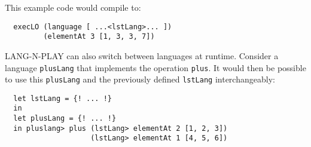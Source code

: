 This example code would compile to:

\begin{verbatim}
  execLO (language [ ...<lstLang>... ]) 
         (elementAt 3 [1, 3, 3, 7])
\end{verbatim}

LANG-N-PLAY can also switch between languages at runtime. Consider a language \lstinline|plusLang| that implements the operation \lstinline|plus|. It would then be possible to use this \lstinline|plusLang| and the previously defined \lstinline|lstLang| interchangeably:

\begin{verbatim}
  let lstLang = {! ... !}
  in 
  let plusLang = {! ... !}
  in pluslang> plus (lstLang> elementAt 2 [1, 2, 3]) 
                    (lstLang> elementAt 1 [4, 5, 6])
\end{verbatim}